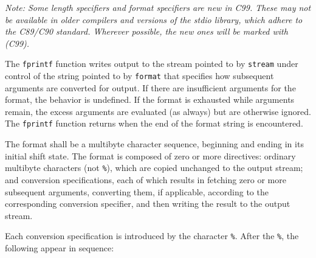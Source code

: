 \emph{Note: Some length specifiers and format specifiers are new in C99. These
may not be available in older compilers and versions of the stdio library,
which adhere to the C89/C90 standard. Wherever possible, the new ones will be
marked with (C99).}

The \texttt{fprintf} function writes output to the stream pointed to by
\texttt{stream} under control of the string pointed to by \texttt{format} that
specifies how subsequent arguments are converted for output. If there are
insufficient arguments for the format, the behavior is undefined. If the format
is exhausted while arguments remain, the excess arguments are evaluated (as
always) but are otherwise ignored. The \texttt{fprintf} function returns when
the end of the format string is encountered.

The format shall be a multibyte character sequence, beginning and ending in its
initial shift state. The format is composed of zero or more directives:
ordinary multibyte characters (not \texttt{\%}), which are copied unchanged to
the output stream; and conversion specifications, each of which results in
fetching zero or more subsequent arguments, converting them, if applicable,
according to the corresponding conversion specifier, and then writing the
result to the output stream.

Each conversion specification is introduced by the character \texttt{\%}. After
the \texttt{\%}, the following appear in sequence:

